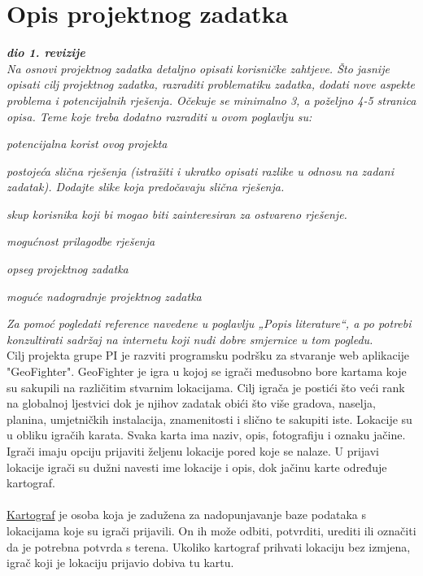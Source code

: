 \chapter{Opis projektnog zadatka}
		
		\textbf{\textit{dio 1. revizije}}\\
		
		\textit{Na osnovi projektnog zadatka detaljno opisati korisničke zahtjeve. Što jasnije opisati cilj projektnog zadatka, razraditi problematiku zadatka, dodati nove aspekte problema i potencijalnih rješenja. Očekuje se minimalno 3, a poželjno 4-5 stranica opisa.	Teme koje treba dodatno razraditi u ovom poglavlju su:}
		\begin{packed_item}
			\item \textit{potencijalna korist ovog projekta}
			\item \textit{postojeća slična rješenja (istražiti i ukratko opisati razlike u odnosu na zadani zadatak). Dodajte slike koja predočavaju slična rješenja.}
			\item \textit{skup korisnika koji bi mogao biti zainteresiran za ostvareno rješenje.}
			\item \textit{mogućnost prilagodbe rješenja }
			\item \textit{opseg projektnog zadatka}
			\item \textit{moguće nadogradnje projektnog zadatka}
		\end{packed_item}
		
		\textit{Za pomoć pogledati reference navedene u poglavlju „Popis literature“, a po potrebi konzultirati sadržaj na internetu koji nudi dobre smjernice u tom pogledu.}\\
		
		\textnormal{Cilj projekta grupe PI je razviti programsku podršku za stvaranje web aplikacije "GeoFighter".  GeoFighter je igra u kojoj se igrači međusobno bore kartama koje su sakupili na različitim stvarnim lokacijama. Cilj igrača je postići što veći rank na globalnoj ljestvici dok je njihov zadatak obići što više  gradova, naselja, planina, umjetničkih instalacija, znamenitosti i slično te sakupiti iste. Lokacije su u obliku igračih karata. Svaka karta ima naziv,  opis, fotografiju i oznaku jačine. Igrači imaju opciju prijaviti željenu lokacije pored koje se nalaze. U prijavi lokacije igrači su dužni navesti ime lokacije i opis, dok jačinu karte određuje kartograf. \\\\ \underline{Kartograf} je osoba koja je zadužena za nadopunjavanje baze podataka s lokacijama koje su igrači prijavili. On ih može odbiti, potvrditi, urediti ili označiti da je potrebna potvrda s terena. Ukoliko kartograf prihvati lokaciju bez izmjena, igrač koji je lokaciju  prijavio dobiva tu kartu.}\\
		
